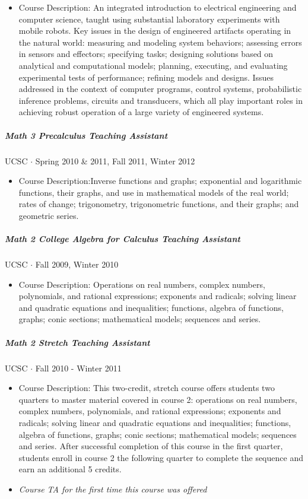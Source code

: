 \documentclass[10pt,letterpaper]{article}
\begin{document}
\begin{itemize}
\item Course Description: An integrated introduction to electrical engineering and computer science, taught using substantial laboratory experiments with mobile robots. Key issues in the design of engineered artifacts operating in the natural world: measuring and modeling system behaviors; assessing errors in sensors and effectors; specifying tasks; designing solutions based on analytical and computational models; planning, executing, and evaluating experimental tests of performance; refining models and designs. Issues addressed in the context of computer programs, control systems, probabilistic inference problems, circuits and transducers, which all play important roles in achieving robust operation of a large variety of engineered systems.
\end{itemize}
\subparagraph{Math 3 Precalculus  Teaching Assistant}
UCSC $\cdot$ Spring 2010 \& 2011, Fall 2011, Winter 2012
\begin{itemize}
\item Course Description:Inverse functions and graphs; exponential and logarithmic functions, their graphs, and use in mathematical models of the real world; rates of change; trigonometry, trigonometric functions, and their graphs; and geometric series. 
\end{itemize}

\subparagraph{Math 2  College Algebra for Calculus Teaching Assistant}
UCSC $\cdot$ Fall 2009, Winter 2010
\begin{itemize}
\item Course Description: Operations on real numbers, complex numbers, polynomials, and rational expressions; exponents and radicals; solving linear and quadratic equations and inequalities; functions, algebra of functions, graphs; conic sections; mathematical models; sequences and series.
\end{itemize}


\subparagraph{Math 2 Stretch Teaching Assistant}
UCSC $\cdot$ Fall 2010 - Winter 2011
\begin{itemize}
\item Course Description: This two-credit, stretch course offers students two quarters to master material covered in course 2: operations on real numbers, complex numbers, polynomials, and rational expressions; exponents and radicals; solving linear and quadratic equations and inequalities; functions, algebra of functions, graphs; conic sections; mathematical models; sequences and series. After successful completion of this course in the first quarter, students enroll in course 2 the following quarter to complete the sequence and earn an additional 5 credits.
\item {\em Course TA for the first time this course was offered}
\end{itemize}
\end{document}
